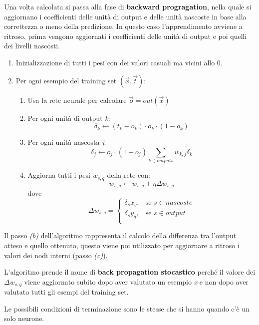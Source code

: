 Una volta calcolata si passa alla fase di
\textbf{backward progragation}, nella quale si aggiornano i coefficienti
delle unità di output e delle unità nascoste in base alla correttezza o
meno della predizione. In questo caso l'apprendimento avviene a ritroso,
prima vengono aggiornati i coefficienti delle unità di output e poi
quelli dei livelli nascosti.

\begin{enumerate}
\item Inizializzazione di tutti i pesi con dei valori casuali ma vicini allo 0.
\item Per ogni esempio del training set $(\vec{x},\vec{t})$:
	\begin{enumerate}
	\item Usa la rete neurale per calcolare $\vec{o} = out(\vec{x})$
	\item Per ogni unità di output \textit{k}: $$\delta_k \leftarrow (t_k - o_k) \cdot o_k \cdot (1 - o_k)$$
	\item Per ogni unità nascosta \textit{j}: $$\delta_j \leftarrow o_j \cdot (1 - o_j) \sum_{k \in outputs} w_{k,j}\delta_k$$
	\item Aggiorna tutti i pesi $w_{s,q}$ della rete con:
	$$ w_{s,q} \leftarrow w_{s,q} + \eta \Delta w_{s,q}$$
	dove
	$$
	\Delta w_{s,q} = 
		\begin{cases}
        	\delta_s x_q,& \text{se } s \in nascoste\\
    		\delta_s y_q,& \text{se } s \in output\\
		\end{cases}
	$$
	\end{enumerate}
\end{enumerate}

Il passo \textit{(b)} dell'algoritmo rappresenta il calcolo della differenza tra
l'output atteso e quello ottenuto, questo viene poi utilizzato per
aggiornare a ritroso i valori dei nodi interni (passo \textit{(c)}).

L'algoritmo prende il nome di \textbf{back propagation stocastico}
perché il valore dei $\Delta w_{s,q}$ viene aggiornato subito dopo aver
valutato un esempio \emph{x} e non dopo aver valutato tutti
gli esempi del training set.

Le possibili condizioni di terminazione sono le stesse che si hanno
quando c'è un solo neurone.
